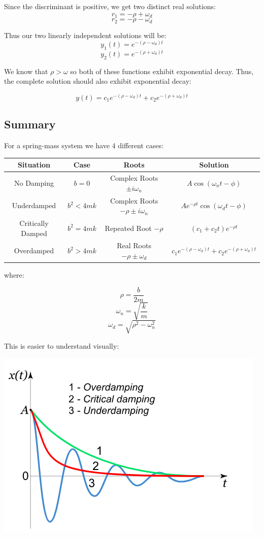 \documentclass{report}
\begin{document}
Since the discriminant is positive, we get two distinct real solutions:
$$r_1 = -\rho + \omega_d$$
$$r_2 = -\rho - \omega_d$$

Thus our two linearly independent solutions will be:
$$y_1(t) = e^{-(\rho - \omega_d)t}$$
$$y_2(t) = e^{-(\rho + \omega_d)t}$$

We know that $\rho > \omega$ so both of these functions exhibit exponential decay. Thus, the complete solution should also exhibit exponential decay:

$$y(t) = c_1e^{-(\rho - \omega_d)t} + c_2e^{-(\rho + \omega_d)t}$$

\subsection{Summary}
For a spring-mass system we have 4 different cases:
\newline


\begin{tabular}{ c c c c}
 \textbf{Situation} & \textbf{Case} & \textbf{Roots} & \textbf{Solution} \\
 \hline
 No Damping & $b=0$ & Complex Roots $\pm i\omega_n$ & $A\cos(\omega_nt - \phi)$ \\ 
 Underdamped & $b^2 < 4mk$ & Complex Roots $-\rho \pm i\omega_n$ &  $Ae^{-\rho t}\cos(\omega_d t - \phi)$\\  
 Critically Damped & $b^2 = 4mk$ & Repeated Root $-\rho$ & $(c_1 + c_2t)e^{-\rho t}$  \\
 Overdamped & $b^2 > 4mk$ & Real Roots $-\rho \pm \omega_d$  & $c_1e^{-(\rho - \omega_d)t} + c_2e^{-(\rho + \omega_d)t}$ \\
\end{tabular}


where:

$$\rho = \frac{b}{2m}$$
$$\omega_n = \sqrt{\frac{k}{m}}$$
$$\omega_d = \sqrt{\rho^2 - \omega_n^2}$$

This is easier to understand visually:

\includegraphics[scale=0.5]{damping.png}
\end{document}
